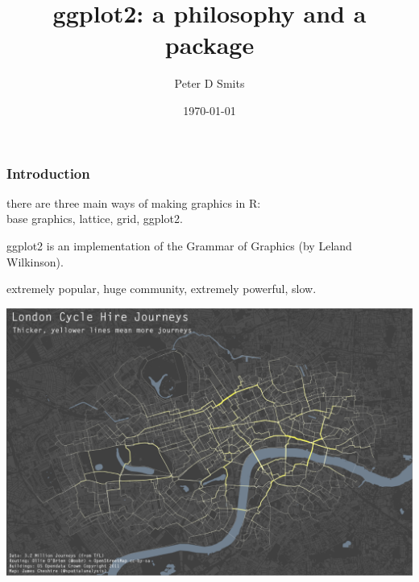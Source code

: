 \documentclass{beamer}\usepackage{graphicx, color}
\title{ggplot2: a philosophy and a package}
\author{Peter D Smits}
\institute{Committee on Evolutionary Biology \\
University of Chicago}
\date{\today}
\begin{document}
\begin{frame}
  \maketitle
\end{frame}

\begin{frame}
  \frametitle{Introduction}

  there are three main ways of making graphics in R:\\
  base graphics, lattice, grid, ggplot2.

  ggplot2 is an implementation of the Grammar of Graphics (by Leland Wilkinson).

  extremely popular, huge community, extremely powerful, slow.

\end{frame}

\begin{frame}
  \includegraphics[width = \textwidth, keepaspectratio = true]{figure/bike_ggplot}

\end{frame}
\end{document}
